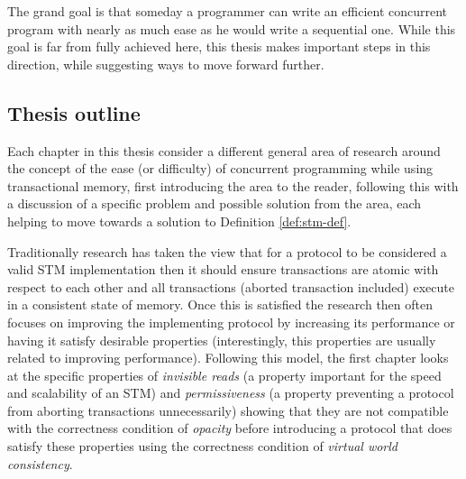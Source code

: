 The grand goal is that someday a programmer can write an efficient concurrent program
with nearly as much ease as he would write a sequential one.
While this goal is far from fully achieved here,
this thesis makes important steps in this direction, while suggesting ways to move forward further.








\subsection{Thesis outline}

Each chapter in this thesis consider a different general area of research around
the concept of the ease (or difficulty) of concurrent programming while using transactional memory, first introducing
the area to the reader, following this with a discussion of a specific problem
and possible solution from the area, each helping to move towards a solution to Definition \ref{def:stm-def}.


Traditionally research has taken the view that for a protocol to be considered a valid STM
implementation then it should ensure transactions
are atomic with respect to each other and all transactions (aborted transaction included)
execute in a consistent state of memory.
Once this is satisfied the research then often focuses on improving the implementing protocol
by increasing its performance or having it satisfy desirable properties
(interestingly, this properties are usually related to improving performance).
Following this model, the first chapter looks at the specific properties of \emph{invisible reads}
(a property important for the speed and scalability of an STM) and
\emph{permissiveness} (a property preventing a protocol from aborting transactions unnecessarily)
showing that they are not compatible with the correctness condition
of \emph{opacity} before introducing a protocol that does satisfy these properties using
the correctness condition of \emph{virtual world consistency}.

